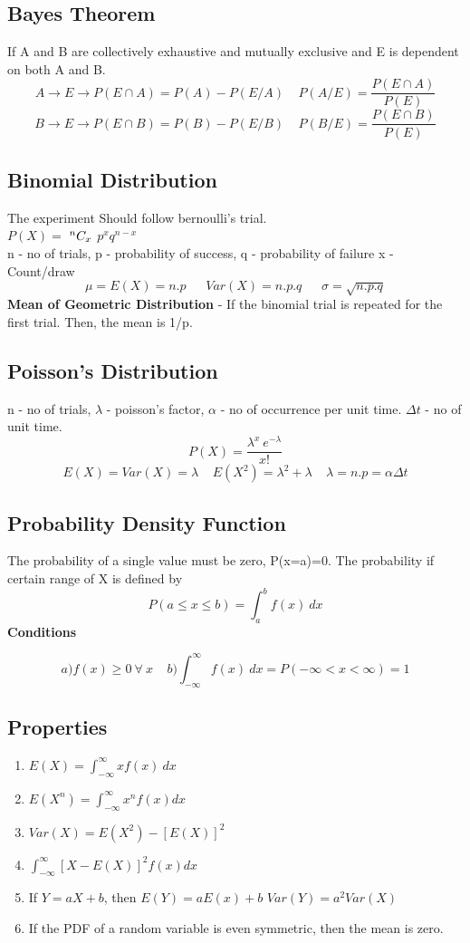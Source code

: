 \subsection*{Bayes Theorem}
If A and B are collectively exhaustive and mutually exclusive and E is dependent on both A and B.
\[A\rightarrow E\rightarrow P(E\cap A)=P(A)-P(E/A)\ \ \ \ \ P(A/E)=\frac{P(E\cap A)}{P(E)} \]
\[B\rightarrow E\rightarrow P(E\cap B)=P(B)-P(E/B)\ \ \ \ \ P(B/E)=\frac{P(E\cap B)}{P(E)}\]

\subsection{Binomial Distribution}
The experiment Should follow bernoulli's trial.\\
\(P(X)=\) ${}^{n}C_{x}$ \(p^xq^{n-x}\)\\
n - no of trials, p - probability of success, q - probability of failure x - Count/draw
\[\mu=E(X)=n.p\ \ \ \ \ \ \ Var(X)=n.p.q\ \ \ \ \ \ \ \sigma = \sqrt{n.p.q} \]
\textbf{Mean of Geometric Distribution} - If the binomial trial is repeated for the first trial. Then, the mean is 1/p.

\subsection{Poisson's Distribution}
n - no of trials, \(\lambda\) - poisson's factor, \(\alpha\) - no of occurrence per unit time.
\(\Delta t\) - no of unit time.
\[P(X)=\frac{\lambda^x\ e^{-\lambda}}{x!}\]
\[E(X) = Var(X) = \lambda\ \ \ \ \ E(X^2)=\lambda^2+\lambda\ \ \ \ \ \lambda=n.p=\alpha\Delta t\]

\subsection{Probability Density Function}
The probability of a single value must be zero, P(x=a)=0. The probability if certain range of X is defined by
\[P(a\leq x \leq b)=\int_a^bf(x)\ dx\]
\textbf{Conditions}\\
\begin{fleqn}
\[a) f(x)\geq0\ \forall\ x\ \ \ \ \ b) \int_{-\infty}^{\infty}f(x)\ dx=P(-\infty < x < \infty) = 1 \]
\end{fleqn}

\subsection*{Properties}
\begin{enumerate}
    \item \(E(X) = \int_{-\infty}^{\infty}xf(x)\ dx\)
    \item \(E(X^n)=\int_{-\infty}^{\infty}x^nf(x)dx\)
    \item \(Var(X)=E(X^2)-[E(X)]^2\)
    \item \(\int_{-\infty}^{\infty}[X-E(X)]^2f(x)dx\)
    \item If \(Y=aX+b\), then \(E(Y)=aE(x)+b\) \(Var(Y)=a^2Var(X)\)
    \item If the PDF of a random variable is even symmetric, then the mean is zero.
\end{enumerate}

